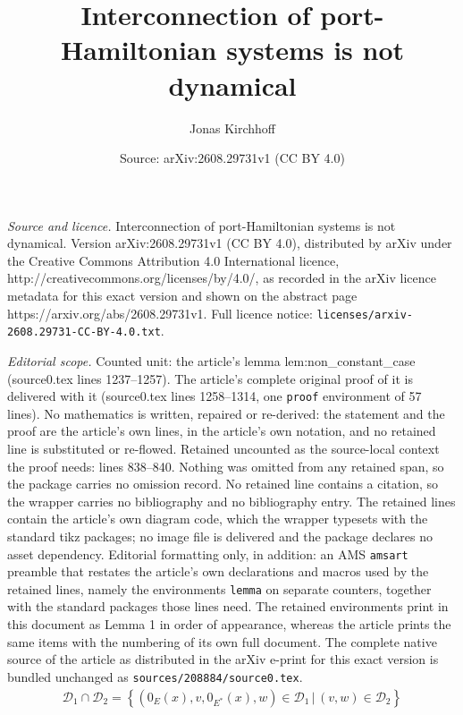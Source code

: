 \documentclass[10pt,a4paper]{amsart}
\title{Interconnection of port-Hamiltonian systems is not dynamical}
\author{Jonas Kirchhoff}
\date{Source: arXiv:2608.29731v1 (CC BY 4.0)}
\newcommand{\set}[1]{\left\lbrace #1\right\rbrace}
\begin{document}
\maketitle

\noindent\emph{Source and licence.} Interconnection of port-Hamiltonian systems is not dynamical. Version arXiv:2608.29731v1 (CC BY 4.0), distributed by arXiv under the Creative Commons Attribution 4.0 International licence, http://creativecommons.org/licenses/by/4.0/, as recorded in the arXiv licence metadata for this exact version and shown on the abstract page https://arxiv.org/abs/2608.29731v1. Full licence notice: \texttt{licenses/arxiv-2608.29731-CC-BY-4.0.txt}.\par\smallskip

\noindent\textit{Editorial scope.} Counted unit: the article's lemma lem:non\_constant\_case (source0.tex lines 1237--1257). The article's complete original proof of it is delivered with it (source0.tex lines 1258--1314, one \texttt{proof} environment of 57 lines). No mathematics is written, repaired or re-derived: the statement and the proof are the article's own lines, in the article's own notation, and no retained line is substituted or re-flowed.  Retained uncounted as the source-local context the proof needs: lines 838--840.  Nothing was omitted from any retained span, so the package carries no omission record.  No retained line contains a citation, so the wrapper carries no bibliography and no bibliography entry.  The retained lines contain the article's own diagram code, which the wrapper typesets with the standard tikz packages; no image file is delivered and the package declares no asset dependency.  Editorial formatting only, in addition: an AMS \texttt{amsart} preamble that restates the article's own declarations and macros used by the retained lines, namely the environments \texttt{lemma} on separate counters, together with the standard packages those lines need.  The retained environments print in this document as Lemma 1 in order of appearance, whereas the article prints the same items with the numbering of its own full document.  The complete native source of the article as distributed in the arXiv e-print for this exact version is bundled unchanged as \texttt{sources/208884/source0.tex}.
\begin{align}\label{eq:intersection}
\mathcal{D}_1\cap\mathcal{D}_2 = \set{(0_E(x),v,0_{E^*}(x),w)\in\mathcal{D}_1\,\big\vert\,(v,w)\in\mathcal{D}_2}
\end{align}
\end{document}
